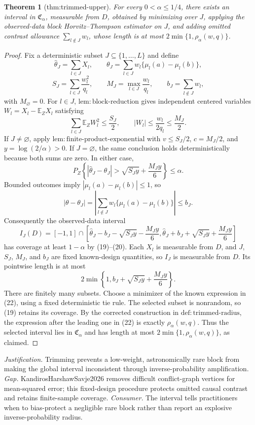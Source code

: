 \documentclass{article}
\newtheorem{theorem}{Theorem}
\begin{document}
\begin{theorem}[thm:trimmed-upper]\label{thm:trimmed-upper}
For every \(0<\alpha\le1/4\), there exists an interval in \(\mathfrak C_\alpha\), measurable from \(D\), obtained by minimizing over \(J\), applying the observed-data block Horvitz--Thompson estimator on \(J\), and adding omitted contrast allowance \(\sum_{l\notin J}w_l\), whose length is at most \(2\min\{1,\rho_\alpha(w,q)\}\).
\end{theorem}
\begin{proof}
Fix a deterministic subset \(J\subseteq\{1,\ldots,L\}\) and define
\[
 \widehat\theta_J=\sum_{l\in J}X_l,
 \qquad
 \theta_J=\sum_{l\in J}w_l\{\mu_l(a)-\mu_l(b)\},
\]
\[
 S_J=\sum_{l\in J}\frac{w_l^2}{q_l},\qquad
 M_J=\max_{l\in J}\frac{w_l}{q_l},\qquad
 b_J=\sum_{l\notin J}w_l,
\tag{17}
\]
with \(M_\varnothing=0\). For \(l\in J\), \(\mathrm{lem{:}block\text{-}reduction}\) gives independent centered variables \(W_l=X_l-\mathbb E_ZX_l\) satisfying
\[
 \sum_{l\in J}\mathbb E_ZW_l^2\le\frac{S_J}{2},
 \qquad
 |W_l|\le\frac{w_l}{2q_l}\le\frac{M_J}{2}.
\tag{18}
\]
If \(J\ne\varnothing\), apply \(\mathrm{lem{:}finite\text{-}product\text{-}exponential}\) with \(v\le S_J/2\), \(c=M_J/2\), and \(y=\log(2/\alpha)>0\). If \(J=\varnothing\), the same conclusion holds deterministically because both sums are zero. In either case,
\[
 P_Z\!\left\{|\widehat\theta_J-\theta_J|>
 \sqrt{S_Jy}+\frac{M_Jy}{6}\right\}\le\alpha.
\tag{19}
\]
Bounded outcomes imply \(|\mu_l(a)-\mu_l(b)|\le1\), so
\[
 |\theta-\theta_J|
 =\left|\sum_{l\notin J}w_l\{\mu_l(a)-\mu_l(b)\}\right|
 \le b_J.
\tag{20}
\]
Consequently the observed-data interval
\[
 I_J(D)=[-1,1]\cap
 \left[\widehat\theta_J-b_J-\sqrt{S_Jy}-\frac{M_Jy}{6},
       \widehat\theta_J+b_J+\sqrt{S_Jy}+\frac{M_Jy}{6}\right]
\tag{21}
\]
has coverage at least \(1-\alpha\) by (19)--(20). Each \(X_l\) is measurable from \(D\), and \(J\), \(S_J\), \(M_J\), and \(b_J\) are fixed known-design quantities, so \(I_J\) is measurable from \(D\). Its pointwise length is at most
\[
 2\min\!\left\{1,b_J+\sqrt{S_Jy}+\frac{M_Jy}{6}\right\}.
\tag{22}
\]
There are finitely many subsets. Choose a minimizer of the known expression in (22), using a fixed deterministic tie rule. The selected subset is nonrandom, so (19) retains its coverage. By the corrected construction in \(\mathrm{def{:}trimmed\text{-}radius}\), the expression after the leading one in (22) is exactly \(\rho_\alpha(w,q)\). Thus the selected interval lies in \(\mathfrak C_\alpha\) and has length at most \(2\min\{1,\rho_\alpha(w,q)\}\), as claimed.
\end{proof}
\par\smallskip\noindent \textit{Justification.} Trimming prevents a low-weight, astronomically rare block from making the global interval inconsistent through inverse-probability amplification. \textit{Gap.} KandirosHarshawSavje2026 removes difficult conflict-graph vertices for mean-squared error; this fixed-design procedure protects omitted causal contrast and retains finite-sample coverage. \textit{Consumer.} The interval tells practitioners when to bias-protect a negligible rare block rather than report an explosive inverse-probability radius.
\end{document}
